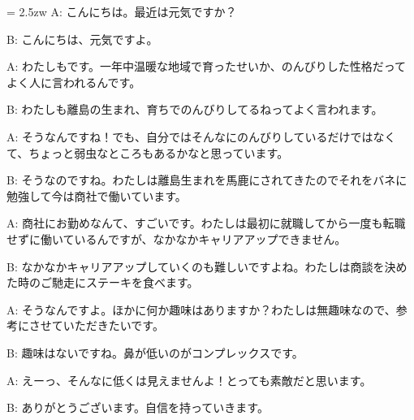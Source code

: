 \documentclass[11pt]{amsart}
\title{}
\author{}
\newenvironment{hangall}[1]{\hangindent = 2.5zw\everypar{\hangindent = 2.5zw}}{}
\begin{document}
\maketitle
\begin{hangall}{}%
A: こんにちは。最近は元気ですか？



B: こんにちは、元気ですよ。



A: わたしもです。一年中温暖な地域で育ったせいか、のんびりした性格だってよく人に言われるんです。



B: わたしも離島の生まれ、育ちでのんびりしてるねってよく言われます。



A: そうなんですね！でも、自分ではそんなにのんびりしているだけではなくて、ちょっと弱虫なところもあるかなと思っています。



B: そうなのですね。わたしは離島生まれを馬鹿にされてきたのでそれをバネに勉強して今は商社で働いています。



A: 商社にお勤めなんて、すごいです。わたしは最初に就職してから一度も転職せずに働いているんですが、なかなかキャリアアップできません。



B: なかなかキャリアアップしていくのも難しいですよね。わたしは商談を決めた時のご馳走にステーキを食べます。



A: そうなんですよ。ほかに何か趣味はありますか？わたしは無趣味なので、参考にさせていただきたいです。



B: 趣味はないですね。鼻が低いのがコンプレックスです。



A: えーっ、そんなに低くは見えませんよ！とっても素敵だと思います。



B: ありがとうございます。自信を持っていきます。\end{hangall}
\end{document}
